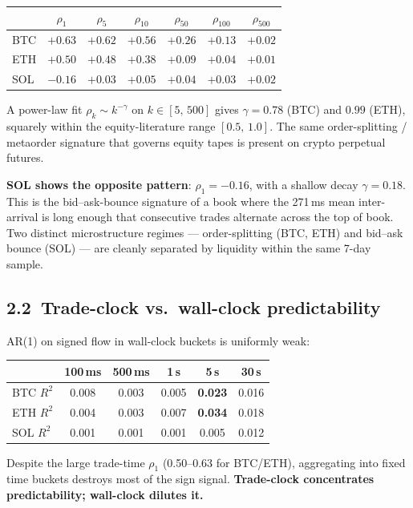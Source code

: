 \documentclass[10pt,a4paper]{article}
\begin{document}
\smallskip
\begin{tabular}{lcccccc}
\toprule
 & $\rho_1$ & $\rho_5$ & $\rho_{10}$ & $\rho_{50}$ & $\rho_{100}$ & $\rho_{500}$ \\
\midrule
BTC & $+0.63$ & $+0.62$ & $+0.56$ & $+0.26$ & $+0.13$ & $+0.02$ \\
ETH & $+0.50$ & $+0.48$ & $+0.38$ & $+0.09$ & $+0.04$ & $+0.01$ \\
SOL & $-0.16$ & $+0.03$ & $+0.05$ & $+0.04$ & $+0.03$ & $+0.02$ \\
\bottomrule
\end{tabular}

\smallskip\noindent
A power-law fit $\rho_k \sim k^{-\gamma}$ on $k \in [5,\, 500]$ gives
$\gamma = 0.78$ (BTC) and $0.99$ (ETH), squarely within the equity-literature
range $[0.5,\, 1.0]$. The same order-splitting / metaorder signature that
governs equity tapes is present on crypto perpetual futures.

\textbf{SOL shows the opposite pattern}: $\rho_1 = -0.16$, with a shallow
decay $\gamma = 0.18$. This is the bid--ask-bounce signature of a book where
the 271\,ms mean inter-arrival is long enough that consecutive trades
alternate across the top of book. Two distinct microstructure regimes ---
order-splitting (BTC, ETH) and bid--ask bounce (SOL) --- are cleanly separated
by liquidity within the same 7-day sample.

\subsection*{2.2\ Trade-clock vs.\ wall-clock predictability}

AR(1) on signed flow in wall-clock buckets is uniformly weak:

\smallskip
\begin{tabular}{lccccc}
\toprule
 & 100\,ms & 500\,ms & 1\,s & 5\,s & 30\,s \\
\midrule
BTC $R^2$ & 0.008 & 0.003 & 0.005 & \textbf{0.023} & 0.016 \\
ETH $R^2$ & 0.004 & 0.003 & 0.007 & \textbf{0.034} & 0.018 \\
SOL $R^2$ & 0.001 & 0.001 & 0.001 & 0.005 & 0.012 \\
\bottomrule
\end{tabular}

\smallskip\noindent
Despite the large trade-time $\rho_1$ (0.50--0.63 for BTC/ETH), aggregating
into fixed time buckets destroys most of the sign signal.
\textbf{Trade-clock concentrates predictability; wall-clock dilutes it.}
\end{document}
